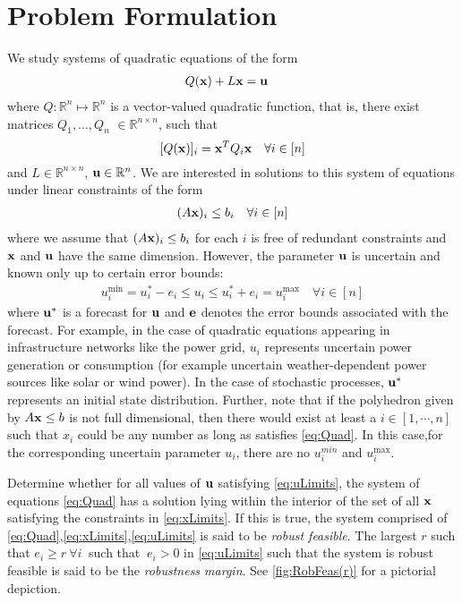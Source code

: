 \section{Problem Formulation} \label{sec:probform}  

We study systems of quadratic equations of the form
\begin{align}
& Q(\mathbf{x})+L\mathbf{x}=\mathbf{u}\label{eq:Quad}
\end{align}
where $Q: \mathbb{R}^n \mapsto \mathbb{R}^n$ is a vector-valued quadratic function, that is, there exist matrices $Q_1,\ldots,Q_n $ $\in \mathbb{R}^{n\times n}$, such that
\[[Q(\mathbf{x})]_i = \mathbf{x}^T Q_{i} \mathbf{x} \quad \forall i \in [n]\]
and $L \in \mathbb{R}^{n\times n}$, $\mathbf{u} \in \mathbb{R}^n$. 
We are interested in solutions to this system of equations under linear constraints of the form
\begin{align}
(A\mathbf{x})_i\leq b_i \quad \forall i \in [n]\label{eq:xLimits}
\end{align}
where we assume that $(A\mathbf{x})_i \leq b_i$ for each $i$ is free of redundant constraints and $\mathbf{x}$ and $\mathbf{u}$ have the same dimension.
However, the parameter $\mathbf{u}$ is uncertain and known only up to certain error bounds:
%
\begin{align}
u^{\min}_i=u_i^*-e_i \leq u_i \leq u_i^*+e_i=u^{\max}_i \quad \forall i \in [n] \label{eq:uLimits}
\end{align}
%
where $\mathbf{u}^*$ is a forecast for $\mathbf{u}$ and $\mathbf{e}$ denotes the error bounds associated with the forecast. 
For example, in the case of quadratic equations appearing in infrastructure networks like the power grid, $u_i$ represents uncertain power generation or consumption (for example uncertain weather-dependent power sources like solar or wind power). 
In the case of stochastic processes, $\mathbf{u}^*$ represents an initial state distribution. Further, note that if the polyhedron given by $A\mathbf{x} \leq b$ is not full dimensional, then there would exist at least a $i\in[1,\dotsb, n]$ such that $x_i$ could be any number as long as satisfies \eqref{eq:Quad}. In this case,for the corresponding uncertain parameter $u_i$, there are no $u_i^{min}$ and $u_i^{\max}$.

\begin{cdef}  \label{RobustDef}
  Determine whether for all values of $\mathbf{u}$ satisfying \eqref{eq:uLimits}, the system of equations \eqref{eq:Quad} has a solution lying within the interior of the set of all  $\mathbf{x}$ satisfying the constraints in \eqref{eq:xLimits}. 
  If this is true, the system comprised of \eqref{eq:Quad},\eqref{eq:xLimits},\eqref{eq:uLimits} is said to be \emph{robust feasible}. 
  The largest $r$ such that $e_i\geq r \ \forall i~$ such that $~e_i>0$ in \eqref{eq:uLimits} such that the system is robust feasible is said to be the \emph{robustness margin}. 
  See \cref{fig:RobFeas(r)} for a pictorial depiction. 
\end{cdef}

